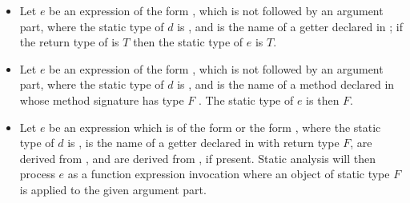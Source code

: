 \documentclass[makeidx]{article}
\begin{document}
{\begin{itemize}
\item
  Let $e$ be an expression of the form ,
  which is not followed by an argument part,
  where the static type of $d$ is \DYNAMIC,
  and \id{} is the name of a getter declared in ;
  if the return type of  is $T$ then
  the static type of $e$ is $T$.

\item
  Let $e$ be an expression of the form ,
  which is not followed by an argument part,
  where the static type of $d$ is \DYNAMIC,
  and \id{} is the name of a method declared in 
  whose method signature has type $F$
  .
  The static type of $e$ is then $F$.

\item
  Let $e$ be an expression which is of the form
  or the form ,
  where the static type of $d$ is \DYNAMIC,
  \id{} is the name of a getter declared in  with return type $F$,
   are derived from , and
   are derived from , if present.
  Static analysis will then process $e$ as a function expression invocation
  where an object of static type $F$ is applied to the given argument part.


\end{itemize}}
\end{document}

